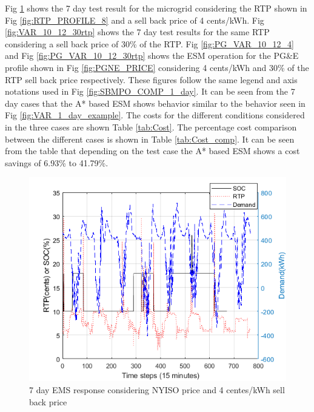 Fig \ref{fig:VAR_10_12_4} shows the 7 day test result for the microgrid considering the RTP shown in Fig \ref{fig:RTP_PROFILE_8} and a sell back price of 4 cents/kWh. Fig \ref{fig:VAR_10_12_30rtp} shows the 7 day test results for the same RTP considering a sell back price of 30\% of the RTP. Fig \ref{fig:PG_VAR_10_12_4} and Fig \ref{fig:PG_VAR_10_12_30rtp} shows the ESM operation for the PG\&E profile shown in Fig \ref{fig:PGNE_PRICE} considering 4 cents/kWh and 30\% of the RTP sell back price respectively. These figures follow the same legend and axis notations used in Fig \ref{fig:SBMPO_COMP_1_day}. It can be seen from the 7 day cases that the A* based ESM shows behavior similar to the behavior seen in  Fig \ref{fig:VAR_1_day_example}. The costs for the different conditions considered in the three cases are shown  Table \ref{tab:Cost}. The percentage cost comparison between the different cases is shown in Table \ref{tab:Cost_comp}. It can be seen from the table that depending on the test case the A* based ESM shows a cost savings of 6.93\% to 41.79\%. 
 \begin{figure}[!ht]
    \centering
    \includegraphics[width = \linewidth]{figs/VAR_10_12_4.png}
    \caption{7 day EMS response considering NYISO price and 4 centes/kWh sell back price}
    \label{fig:VAR_10_12_4}
\end{figure}

